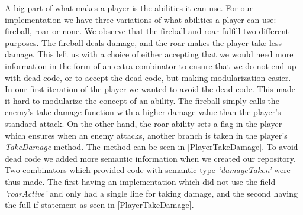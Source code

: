 A big part of what makes a player is the abilities it can use. For our implementation we have three variations of what abilities a player can use: fireball, roar or none. We observe that the fireball and roar fulfill two different purposes. The fireball deals damage, and the roar makes the player take less damage. This left us with a choice of either accepting that we would need more information in the form of an extra combinator to ensure that we do not end up with dead code, or to accept the dead code, but making modularization  easier.\\
In our first iteration of the player we wanted to avoid the dead code. This made it hard to modularize the concept of an ability. The fireball simply calls the enemy's take damage function with a higher damage value than the player's standard attack. On the other hand, the roar ability sets a flag in the player which ensures when an enemy attacks, another branch is taken in the player's \textit{TakeDamage} method. The method can be seen in \autoref{PlayerTakeDamage}. To avoid dead code we added more semantic information when we created our repository. Two combinators which provided code with semantic type \textit{'damageTaken'} were thus made. The first having an implementation which did not use the field \textit{'roarActive'} and only had a single line for taking damage, and the second having the full if statement as seen in \autoref{PlayerTakeDamage}.

